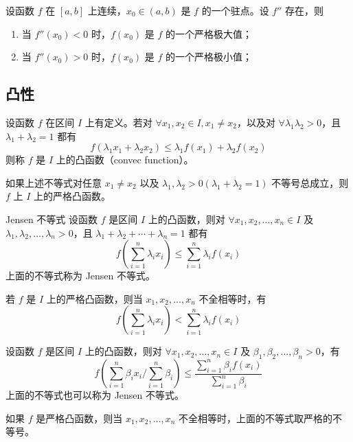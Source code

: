 \begin{theorem}
    设函数 $f$ 在 $[a,b]$ 上连续，$x_0 \in (a,b)$ 是 $f$ 的一个驻点。设 $f''$ 存在，则
    \begin{enumerate}
        \item 当 $f''(x_0) < 0$ 时，$f(x_0)$ 是 $f$ 的一个严格极大值；
        \item 当 $f''(x_0) > 0$ 时，$f(x_0)$ 是 $f$ 的一个严格极小值；
    \end{enumerate}
\end{theorem}

\subsection{凸性}

\begin{definition}
    设函数 $f$ 在区间 $I$ 上有定义。若对 $\forall x_1,x_2 \in I, x_1 \ne x_2$，以及对 $\forall \lambda_1 \lambda_2 > 0$，且 $\lambda_1 + \lambda_2 = 1$ 都有
    \[f(\lambda_{1}x_1 + \lambda_{2}x_2) \leqslant \lambda_{1}f(x_1) + \lambda_{2}f(x_2)\]
    则称 $f$ 是 $I$ 上的凸函数（convec function）。

    如果上述不等式对任意 $x_1 \ne x_2$ 以及 $\lambda_1,\lambda_2 > 0(\lambda_1 + \lambda_2 = 1)$ 不等号总成立，则 $f$ 上 $I$ 上的严格凸函数。
\end{definition}

\begin{theorem}{Jensen 不等式}
    设函数 $f$ 是区间 $I$ 上的凸函数，则对 $\forall x_1,x_2, \ldots ,x_n \in I$ 及 $\lambda_1,\lambda_2, \ldots ,\lambda_n > 0$，且 $\lambda_1 + \lambda_2 + \cdots + \lambda_n = 1$ 都有
    \[f(\sum_{i = 1}^{n}\lambda_{i}x_i) \leqslant \sum_{i = 1}^{n}\lambda_{i}f(x_i)\]
    上面的不等式称为 Jensen 不等式。

    若 $f$ 是 $I$ 上的严格凸函数，则当 $x_1,x_2, \ldots ,x_n$ 不全相等时，有
    \[f(\sum_{i = 1}^{n}\lambda_{i}x_i) < \sum_{i = 1}^{n}\lambda_{i}f(x_i)\]
\end{theorem}

\begin{theorem}
    设函数 $f$ 是区间 $I$ 上的凸函数，则对 $\forall x_1,x_2, \ldots ,x_n \in I$ 及 $\beta_1,\beta_2, \ldots ,\beta_n >0$，有
    \[f(\sum_{i = 1}^{n}\beta_{i}x_{i}/\sum_{i = 1}^{n}\beta_i) \leqslant \frac{\displaystyle \sum_{i = 1}^{n}\beta_{i}f(x_i)}{\displaystyle \sum_{i = 1}^{n}\beta_i}\]
    上面的不等式也可以称为 Jensen 不等式。

    如果 $f$ 是严格凸函数，则当 $x_1,x_2, \ldots ,x_n$ 不全相等时，上面的不等式取严格的不等号。
\end{theorem}

